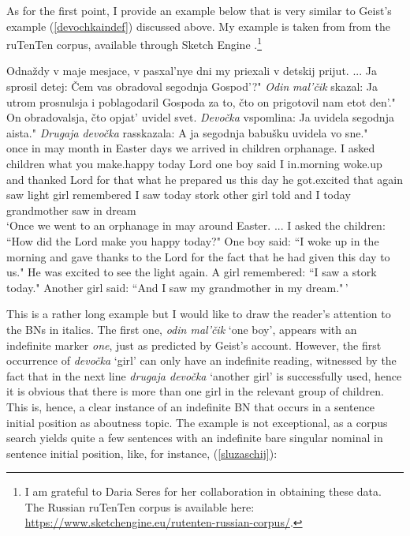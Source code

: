 \documentclass[output=paper,colorlinks,citecolor=brown]{langscibook}
\begin{document}
As for the first point, I provide an example below that is very similar to Geist's example (\ref{devochkaindef}) discussed above. My example is taken from from the ruTenTen corpus, 
available through Sketch Engine \citep[][]{kilgarriff2014sketch}.\footnote{I am grateful to Daria Seres for her collaboration in obtaining these data. The Russian ruTenTen corpus is available here: \url{https://www.sketchengine.eu/rutenten-russian-corpus/}.}

\ea\gll 
Odna\v{z}dy v maje mesjace, v pasxal'nye dni my priexali v detskij prijut. ... Ja sprosil detej:  \v{C}em vas obradoval segodnja Gospod'?" \textit{Odin} \textit{mal'\v{c}ik} skazal:  Ja utrom prosnulsja i poblagodaril Gospoda za to, \v{c}to on prigotovil nam etot den'." On obradovalsja, \v{c}to opjat' uvidel svet. \textit{Devo\v{c}ka} vspomlina:  Ja uvidela segodnja aista." \textit{Drugaja} \textit{devo\v{c}ka} rasskazala:  A ja segodnja babu\v{s}ku uvidela vo sne." \label{pasxa} \\
once in may month in Easter days we arrived in children orphanage. {} I asked children {} what you make.happy today Lord one boy said {} I in.morning woke.up and thanked Lord for that what he prepared us this day he got.excited that again saw light girl remembered {} I saw today stork other girl told {} and I today grandmother saw in dream \\
\glt `Once we went to an orphanage in may around Easter. ... I asked the children: ``How did the Lord make you happy today?" One boy said: ``I woke up in the morning and gave thanks to the Lord for the fact that he had given this day to us." He was excited to see the light again. A girl remembered: ``I saw a stork today." Another girl said: ``And I saw my grandmother in my dream."\,'
\z

\noindent This is a rather long example but I would like to draw the reader's attention to the BNs in italics. The first one, \textit{odin mal'\v{c}ik} `one boy', appears with an indefinite marker \textit{one}, just as predicted by Geist's account. However, the first occurrence of \textit{devo\v{c}ka} `girl' can only have an indefinite reading, witnessed by the fact that in the next line \textit{drugaja devo\v{c}ka} `another girl' is successfully used, hence it is obvious that there is more than one girl in the relevant group of children. This is, hence, a clear instance of an indefinite BN that occurs in a sentence initial position as aboutness topic. The example is not exceptional, as a corpus search yields quite a few sentences with an indefinite bare singular nominal in sentence initial position, like, for instance, (\ref{sluzaschij}):
\end{document}
